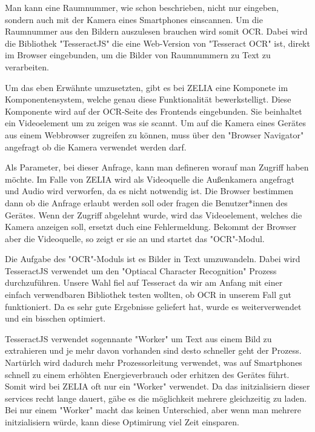 
Man kann eine Raumnummer, wie schon beschrieben, nicht nur eingeben, sondern auch mit der Kamera eines Smartphones einscannen. Um die Raumnummer aus den Bildern auszulesen brauchen wird somit OCR. Dabei wird die Bibliothek "TesseractJS" die eine Web-Version von "Tesseract OCR" ist, direkt im Browser eingebunden, um die Bilder von Raumnummern zu Text zu verarbeiten.

Um das eben Erwähnte umzusetzten, gibt es bei ZELIA eine Komponete im Komponentensystem, welche genau diese Funktionalität bewerkstelligt. Diese Komponente wird auf der OCR-Seite des Frontends eingebunden. Sie beinhaltet ein Videoelement um zu zeigen was sie scannt. Um auf die Kamera eines Gerätes aus einem Webbrowser zugreifen zu können, muss über den "Browser Navigator" angefragt ob die Kamera verwendet werden darf.


Als Parameter, bei dieser Anfrage, kann man defineren worauf man Zugriff haben möchte. Im Falle von ZELIA wird als Videoquelle die Außenkamera angefragt und Audio wird verworfen, da es nicht notwendig ist. Die Browser bestimmen dann ob die Anfrage erlaubt werden soll oder fragen die Benutzer*innen des Gerätes. Wenn der Zugriff abgelehnt wurde, wird das Videoelement, welches die Kamera anzeigen soll, ersetzt duch eine Fehlermeldung. Bekommt der Browser aber die Videoquelle, so zeigt er sie an und startet das "OCR"-Modul.

Die Aufgabe des "OCR"-Moduls ist es Bilder in Text umzuwandeln. Dabei wird TesseractJS verwendet um den "Optiacal Character Recognition" Prozess durchzuführen. Unsere Wahl fiel auf Tesseract da wir am Anfang mit einer einfach verwendbaren Bibliothek testen wollten, ob OCR in unserem Fall gut funktioniert. Da es sehr gute Ergebnisse geliefert hat, wurde es weiterverwendet und ein bisschen optimiert.


TesseractJS verwendet sogennante "Worker" um Text aus einem Bild zu extrahieren und je mehr davon vorhanden sind desto schneller geht der Prozess. Nartürlch wird dadurch mehr Prozessorleitung verwendet, was auf Smartphones schnell zu einem erhöhten Energieverbrauch oder erhitzen des Gerätes führt. Somit wird bei ZELIA oft nur ein "Worker" verwendet. Da das initzialisiern dieser services recht lange dauert, gäbe es die möglichkeit mehrere gleichzeitig zu laden. Bei nur einem "Worker" macht das keinen Unterschied, aber wenn man mehrere initzialisiern würde, kann diese Optimirung viel Zeit einsparen.

